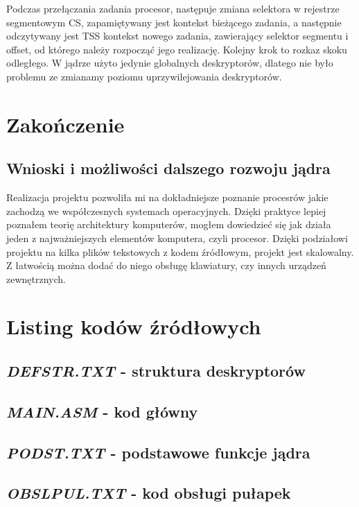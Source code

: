 \documentclass[a4paper,12pt]{article}
\begin{document}
Podczas przełączania zadania procesor, następuje zmiana selektora w rejestrze segmentowym CS, zapamiętywany jest kontekst bieżącego zadania, a następnie odczytywany jest TSS kontekst nowego zadania, zawierający selektor segmentu i offset, od którego należy rozpocząć jego realizację. Kolejny krok to rozkaz skoku odległego. W jądrze użyto jedynie globalnych deskryptorów, dlatego nie było problemu ze zmianamy poziomu uprzywilejowania deskryptorów. 

	\section{Zakończenie}
\subsection{Wnioski i możliwości dalszego rozwoju jądra}
Realizacja projektu pozwoliła mi na dokładniejsze poznanie procesrów jakie zachodzą we współczesnych systemach operacyjnych. Dzięki praktyce lepiej poznałem teorię architektury komputerów, mogłem dowiedzieć się jak działa jeden z najważniejszych elementów komputera, czyli procesor. Dzięki podziałowi projektu na kilka plików tekstowych z kodem źródłowym, projekt jest skalowalny. Z łatwością można dodać do niego obsługę klawiatury, czy innych urządzeń zewnętrznych.

\section{Listing kodów źródłowych}


\subsection{\textit{DEFSTR.TXT} - struktura deskryptorów}


\subsection{\textit{MAIN.ASM} - kod główny}


\subsection{\textit{PODST.TXT} - podstawowe funkcje jądra}


\subsection{\textit{OBSLPUL.TXT} - kod obsługi pułapek}

\end{document}

